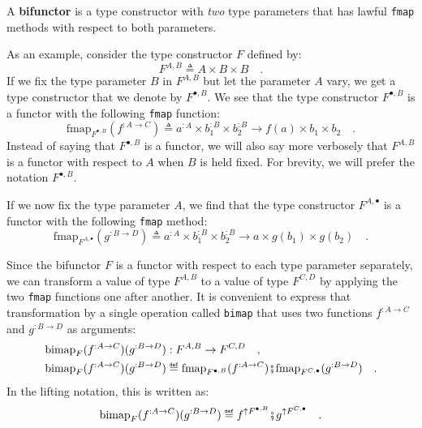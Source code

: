 A \textbf{bifunctor} is a type constructor with
\emph{two} type parameters that has lawful \lstinline!fmap! methods
with respect to both parameters.

As an example, consider the type constructor $F$ defined by:
\[
F^{A,B}\triangleq A\times B\times B\quad.
\]
If we fix the type parameter $B$ in $F^{A,B}$ but let the parameter
$A$ vary, we get a type constructor that we denote by $F^{\bullet,B}$.
We see that the type constructor $F^{\bullet,B}$ is a functor with
the following \lstinline!fmap! function:
\[
\text{fmap}_{F^{\bullet,B}}(f^{:A\rightarrow C})\triangleq a^{:A}\times b_{1}^{:B}\times b_{2}^{:B}\rightarrow f(a)\times b_{1}\times b_{2}\quad.
\]
Instead of saying that $F^{\bullet,B}$ is a functor, we will also
say more verbosely that $F^{A,B}$ is a functor with respect to $A$
when $B$ is held fixed. For brevity, we will prefer the notation
$F^{\bullet,B}$.

If we now fix the type parameter $A$, we find that the type constructor
$F^{A,\bullet}$ is a functor with the following \lstinline!fmap!
method:
\[
\text{fmap}_{F^{A,\bullet}}(g^{:B\rightarrow D})\triangleq a^{:A}\times b_{1}^{:B}\times b_{2}^{:B}\rightarrow a\times g(b_{1})\times g(b_{2})\quad.
\]

Since the bifunctor $F$ is a functor with respect to each type parameter
separately, we can transform a value of type $F^{A,B}$ to a value
of type $F^{C,D}$ by applying the two \lstinline!fmap! functions
one after another. It is convenient to express that transformation
by a single operation called \lstinline!bimap! that uses two functions
$f^{:A\rightarrow C}$ and $g^{:B\rightarrow D}$ as arguments:
\begin{align}
\text{bimap}_{F}(f^{:A\rightarrow C})(g^{:B\rightarrow D}) & :F^{A,B}\rightarrow F^{C,D}\quad,\nonumber \\
\text{bimap}_{F}(f^{:A\rightarrow C})(g^{:B\rightarrow D}) & \triangleq\text{fmap}_{F^{\bullet,B}}(f^{:A\rightarrow C})\bef\text{fmap}_{F^{C,\bullet}}(g^{:B\rightarrow D})\quad.\label{eq:f-definition-of-bimap}
\end{align}
In the lifting notation, this is written as:
\[
\text{bimap}_{F}(f^{:A\rightarrow C})(g^{:B\rightarrow D})\triangleq f^{\uparrow F^{\bullet,B}}\bef g^{\uparrow F^{C,\bullet}}\quad.
\]

